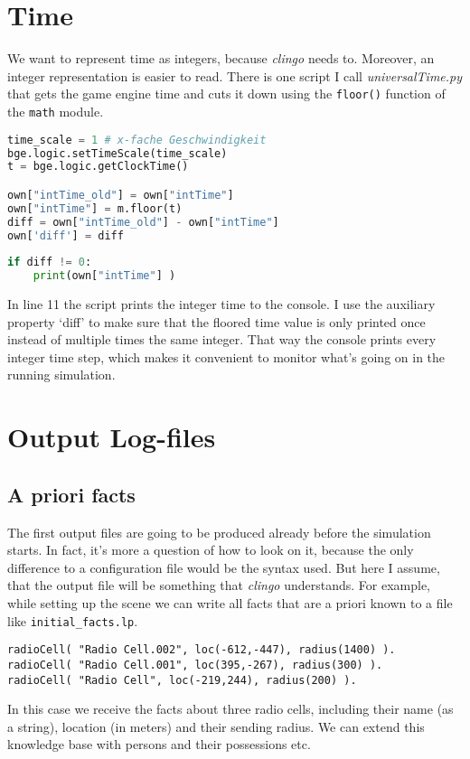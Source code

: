 \documentclass[11pt,a4paper]{article}
\begin{document}
\section{Time}
We want to represent time as integers, because \textit{clingo} needs to. Moreover, an integer representation is easier to read. There is one script I call \textit{universalTime.py} that gets the game engine time and cuts it down using the \texttt{floor()} function of the \texttt{math} module. 
\begin{lstlisting}[language = Python, breaklines=true, caption={Universal Time}]
time_scale = 1 # x-fache Geschwindigkeit    
bge.logic.setTimeScale(time_scale)
t = bge.logic.getClockTime()

own["intTime_old"] = own["intTime"] 
own["intTime"] = m.floor(t)         
diff = own["intTime_old"] - own["intTime"] 
own['diff'] = diff
  
if diff != 0:
    print(own["intTime"] ) 
\end{lstlisting}
In line 11 the script prints the integer time to the console. I use the auxiliary property `diff' to make sure that the floored time value is only printed once instead of multiple times the same integer. That way the console prints every integer time step, which makes it convenient to monitor what's going on in the running simulation.



\section{Output Log-files}
\subsection{A priori facts}
The first output files are going to be produced already before the simulation starts. In fact, it's more a question of how to look on it, because the only difference to a configuration file would be the syntax used. But here I assume, that the output file will be something that \textit{clingo} understands. 
For example, while setting up the scene we can write all facts that are a priori known to a file like \texttt{initial\_facts.lp}. 
\begin{lstlisting}[caption={A priori facts for clingo}]
radioCell( "Radio Cell.002", loc(-612,-447), radius(1400) ).
radioCell( "Radio Cell.001", loc(395,-267), radius(300) ).
radioCell( "Radio Cell", loc(-219,244), radius(200) ).
\end{lstlisting}
In this case we receive the facts about three radio cells, including their name (as a string), location (in meters) and their sending radius. We can extend this knowledge base with persons and their possessions etc.
\end{document}

